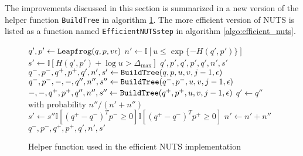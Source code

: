 The improvements discussed in this section is summarized in a new version of the helper function {\tt BuildTree} in algorithm \ref{algo:build_tree_efficient}. The more efficient version of NUTS is listed as a function named {\tt EfficientNUTSstep} in algorithm \ref{algo:efficient_nuts}.

\begin{comment}
    The factorization of the uniform probability over $\mathcal{C}'$ implies that it can be written as a product of the probability of choosing a leaf from the subtree and the probability
    of chosing $(q, p)$ uniformly from $\mathcal{C}_\text{subtree}$. Except for the initial tree at depth $j=0$, each subtree contains two subtrees of their own.
    For each such subtree, a pair of points $(q, p)$ and $(q', p')$ is sampled. One of these points are then chosen uniformly to represent that subtree.
    Additionally, an integer weight $n'$ is stored representing how many elements of $\mathcal{C}'$ that pertain to said subtree. 
\end{comment}



\begin{figure}[H]
	\begin{algorithm}[H]
	\caption{Helper function used in the efficient NUTS implementation}\label{algo:build_tree_efficient}
	\begin{algorithmic}
                \State $q', p' \gets {\tt Leapfrog}(q, p, v\epsilon)$
                \State $n' \gets \mathbb{I}\left[u \leq \exp\{-H(q', p')\}\right]$
                \State $s' \gets \mathbb{I}\left[H(q', p') + \log u > \Delta_\text{max}\right]$
                \State \Return $q', p', q', p', q', n', s'$
            \Else
                \State $q^-, p^-, q^+, p^+, q', n', s' \gets {\tt BuildTree}(q, p, u, v, j - 1, \epsilon)$
                    \State $q^-,p^-, -, -, q'', n'', s'' \gets {\tt BuildTree}(q^-, p^-, u, v, j - 1, \epsilon)$
                \Else
                    \State $-, -, q^+, p^+, q'', n'', s'' \gets {\tt BuildTree}(q^+, p^+, u, v, j - 1, \epsilon)$
                \EndIf
                \State $q' \gets q''$ with probability $n'' / (n' + n'')$
                \State $s' \gets s''\mathbb{I}\left[(q^+ - q^-)^T p^- \geq 0\right] \mathbb{I}\left[(q^+ - q^-)^T p^+ \geq 0\right]$
                \State $n' \gets n' + n''$
                \State \Return $q^-, p^-, q^+, p^+, q', n', s'$ 
            \EndIf
        \EndFunction
	\end{algorithmic}
	\end{algorithm}
\end{figure}

